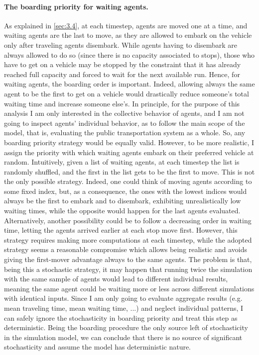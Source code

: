 \paragraph{The boarding priority for waiting agents.}
As explained in \ref{sec:3.4}, at each timestep, agents are moved one at a time, and waiting agents are the last to move, as they are allowed to embark on the vehicle only after traveling agents disembark. While agents having to disembark are always allowed to do so (since there is no capacity associated to stops), those who have to get on a vehicle may be stopped by the constraint that it has already reached full capacity and forced to wait for the next available run. Hence, for waiting agents, the boarding order is important. Indeed, allowing always the same agent to be the first to get on a vehicle would drastically reduce someone's total waiting time and increase someone else's.
In principle, for the purpose of this analysis I am only interested in the collective behavior of agents, and I am not going to inspect agents' individual behavior, as to follow the main scope of the model, that is, evaluating the public transportation system as a whole. So, any boarding priority strategy would be equally valid. However, to be more realistic, I assign the priority with which waiting agents embark on their preferred vehicle at random. 
Intuitively, given a list of waiting agents, at each timestep the list is randomly shuffled, and the first in the list gets to be the first to move. This is not the only possible strategy. Indeed, one could think of moving agents according to some fixed index, but, as a consequence, the ones with the lowest indices would always be the first to embark and to disembark, exhibiting unrealistically low waiting times, while the opposite would happen for the last agents evaluated. Alternatively, another possibility could be to follow a decreasing order in waiting time, letting the agents arrived earlier at each stop move first. However, this strategy requires making more computations at each timestep, while the adopted strategy seems a reasonable compromise which allows being realistic and avoids giving the first-mover advantage always to the same agents. The problem is that, being this a stochastic strategy, it may happen that running twice the simulation with the same sample of agents would lead to different individual results, meaning the same agent could be waiting more or less across different simulations with identical inputs. Since I am only going to evaluate aggregate results (e.g. mean traveling time, mean waiting time, ...) and neglect individual patterns, I can safely ignore the stochasticity in boarding priority and treat this step as deterministic. Being the boarding procedure the only source left of stochasticity in the simulation model, we can conclude that there is no source of significant stochasticity and assume the model has deterministic nature.

